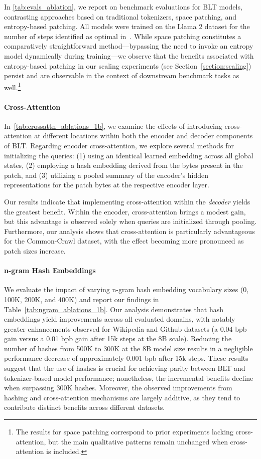 In \autoref{tab:evals_ablation}, we report on benchmark evaluations for {\textsc BLT} models, contrasting approaches based on traditional tokenizers, space patching, and entropy-based patching. All models were trained on the Llama 2 dataset for the number of steps identified as optimal in~\citep{dubey2024llama}. While space patching constitutes a comparatively straightforward method—bypassing the need to invoke an entropy model dynamically during training—we observe that the benefits associated with entropy-based patching in our scaling experiments (see Section~\ref{section:scaling}) persist and are observable in the context of downstream benchmark tasks as well.\footnote{The results for space patching correspond to prior experiments lacking cross-attention, but the main qualitative patterns remain unchanged when cross-attention is included.}

\paragraph{Cross-Attention} 
In~\autoref{tab:crossattn_ablations_1b}, we examine the effects of introducing cross-attention at different locations within both the encoder and decoder components of {\textsc BLT}. Regarding encoder cross-attention, we explore several methods for initializing the queries: (1) using an identical learned embedding across all global states, (2) employing a hash embedding derived from the bytes present in the patch, and (3) utilizing a pooled summary of the encoder’s hidden representations for the patch bytes at the respective encoder layer.

Our results indicate that implementing cross-attention within the \textit{decoder} yields the greatest benefit. Within the encoder, cross-attention brings a modest gain, but this advantage is observed solely when queries are initialized through pooling. Furthermore, our analysis shows that cross-attention is particularly advantageous for the Common-Crawl dataset, with the effect becoming more pronounced as patch sizes increase.

\paragraph{n-gram Hash Embeddings} 

We evaluate the impact of varying n-gram hash embedding vocabulary sizes (0, 100K, 200K, and 400K) and report our findings in Table~\ref{tab:ngram_ablations_1b}. Our analysis demonstrates that hash embeddings yield improvements across all evaluated domains, with notably greater enhancements observed for Wikipedia and Github datasets (a 0.04 bpb gain versus a 0.01 bpb gain after 15k steps at the 8B scale). Reducing the number of hashes from 500K to 300K at the 8B model size results in a negligible performance decrease of approximately 0.001 bpb after 15k steps. These results suggest that the use of hashes is crucial for achieving parity between {\textsc BLT} and tokenizer-based model performance; nonetheless, the incremental benefits decline when surpassing 300K hashes. Moreover, the observed improvements from hashing and cross-attention mechanisms are largely additive, as they tend to contribute distinct benefits across different datasets.

